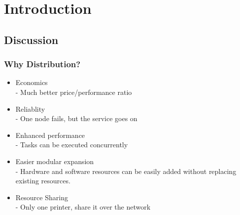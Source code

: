 \section{Introduction}



\subsection{Discussion}

\begin{frame}
    \frametitle{Why Distribution?}
    \begin{itemize}
        \item Economics \\
            - Much better price/performance ratio
        \item Reliablity \\
            - One node fails, but the service goes on
        \item Enhanced performance \\
            - Tasks can be executed concurrently
        \item Easier modular expansion \\
            - Hardware and software resources can be easily added without replacing existing resources.
        \item Resource Sharing \\
            - Only one printer, share it over the network
    \end{itemize}
\end{frame}

